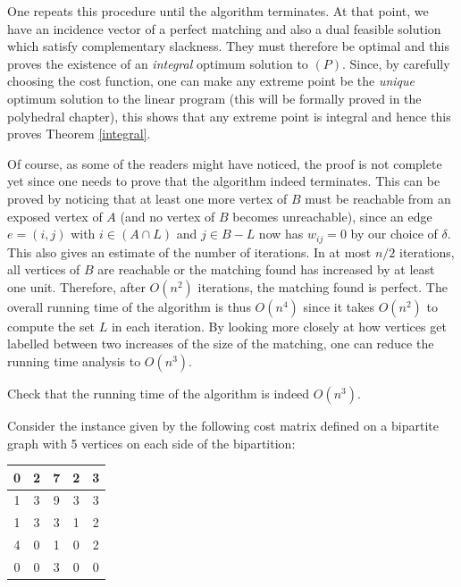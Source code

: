 \documentclass[12pt]{article}
\begin{document}
One repeats this procedure until the algorithm terminates. At that
point, we have an incidence vector of a perfect matching and also a
dual feasible solution which satisfy complementary slackness. They must
therefore be optimal and this proves the existence of an {\it
integral} optimum solution to $(P)$. Since, by carefully choosing the
cost function, one can make any extreme point be the {\it unique} optimum
solution to the linear program (this will be formally proved in the
polyhedral chapter), this shows that any extreme point is integral and
hence this proves Theorem \ref{integral}.

Of course, as some of the readers might have noticed, the proof is not
complete yet since one needs to prove that the algorithm indeed
terminates. This can be proved by noticing that at least one more
vertex of $B$ must be reachable from an exposed vertex of $A$ (and no
vertex of $B$ becomes unreachable), since an edge $e=(i,j)$ with $i\in
(A\cap L)$ and $j\in B-L$ now has $w_{ij}=0$ by our choice of $\delta$. 
This also gives an estimate of the number of iterations. In at most
$n/2$ iterations, all vertices of $B$ are reachable or the matching
found has increased by at least one unit. Therefore, after $O(n^2)$
iterations, the matching found is perfect. The overall running time of
the algorithm is thus $O(n^4)$ since it takes $O(n^2)$ to compute the
set $L$ in each iteration. By looking more closely at how vertices get
labelled between two increases of the size of the matching, one can
reduce the running time analysis to $O(n^3)$.

\begin{exercises}
\item
Check that the running time of the algorithm
is indeed $O(n^3)$.
\end{exercises}

 Consider the instance given by the following
cost matrix defined on a bipartite graph with 5 vertices on each side
of the bipartition: 

\begin{center}
\begin{tabular}{|c|c|c|c|c|} \hline
0 & 2 & 7 & 2 & 3 \\ \hline
1 & 3 & 9 & 3 & 3 \\ \hline
1 & 3 & 3 & 1 & 2 \\ \hline
4 & 0 & 1 & 0 & 2 \\ \hline
0 & 0 & 3 & 0 & 0 \\ \hline
\end{tabular}\end{center}
\end{document}
